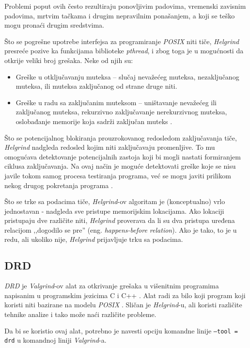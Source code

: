 \documentclass[12pt,oneside]{memoir}
\theoremstyle{plain}
\theoremstyle{definition}
\begin{document}
Problemi poput ovih često rezultiraju ponovljivim padovima, vremenski zavisnim padovima, mrtvim tačkama i drugim nepravilnim ponašanjem, a koji se teško mogu pronaći drugim sredstvima.

Što se pogrešne upotrebe interfejsa za programiranje \textit{POSIX} niti tiče, \textit{Helgrind} presreće pozive ka funkcijama biblioteke \textit{pthread}, i zbog toga je u mogućnosti da otkrije veliki broj grešaka. Neke od njih su: 
\begin{itemize}
\item Greške u otključavanju muteksa – slučaj nevažećeg muteksa, nezaključanog muteksa, ili muteksa zaključanog od strane druge niti.
\item Greške u radu sa zaključanim muteksom – uništavanje nevažećeg ili zaključanog muteksa, rekurzivno zaključavanje nerekurzivnog muteksa, oslobađanje memorije koja sadrži zaključan muteks \cite{Helgrind}.
\end{itemize}

Što se potencijalnog blokiranja prouzrokovanog redosledom zaključavanja tiče, \textit{Helgrind} nadgleda redosled kojim niti zaključavaju promenljive. To mu omogućava detektovanje potencijalnih zastoja koji bi mogli nastati formiranjem ciklusa zaključavanja. Na ovaj način je moguće detektovati greške koje se nisu javile tokom samog procesa testiranja programa, već se mogu javiti prilikom nekog drugog pokretanja programa \cite{Helgrind}.

Što se trke sa podacima tiče, \textit{Helgrind}-ov algoritam je (konceptualno) vrlo jednostavan - nadgleda sve pristupe memorijskim lokacijama. Ako lokaciji pristupaju dve različite niti, \textit{Helgrind} proverava da li su dva pristupa uređena relacijom ,,dogodilo se pre'' (eng. \textit{happens-before relation}). Ako je tako, to je u redu, ali ukoliko nije, \textit{Helgrind} prijavljuje trku sa podacima.

\subsection{DRD}
\textit{DRD} je \textit{Valgrind}-ov alat za otkrivanje grešaka u višenitnim programima napisanim u programskim jezicima C i C++ \cite{Drd}. Alat radi za bilo koji program koji koristi niti bazirane na modelu \textit{POSIX} \cite{Drd}. Sličan je \textit{Helgrind}-u, ali koristi različite tehnike analize i tako može naći različite probleme.

Da bi se koristio ovaj alat, potrebno je navesti opciju komandne linije \texttt{--tool = drd} u komandnoj liniji \textit{Valgrind}-a.
\end{document}
